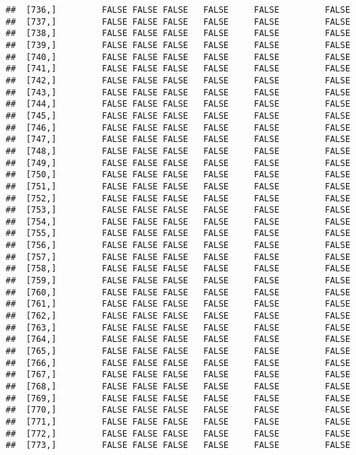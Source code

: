 \documentclass[
]{article}
\begin{document}
\begin{verbatim}
##  [736,]         FALSE FALSE FALSE   FALSE     FALSE         FALSE
##  [737,]         FALSE FALSE FALSE   FALSE     FALSE         FALSE
##  [738,]         FALSE FALSE FALSE   FALSE     FALSE         FALSE
##  [739,]         FALSE FALSE FALSE   FALSE     FALSE         FALSE
##  [740,]         FALSE FALSE FALSE   FALSE     FALSE         FALSE
##  [741,]         FALSE FALSE FALSE   FALSE     FALSE         FALSE
##  [742,]         FALSE FALSE FALSE   FALSE     FALSE         FALSE
##  [743,]         FALSE FALSE FALSE   FALSE     FALSE         FALSE
##  [744,]         FALSE FALSE FALSE   FALSE     FALSE         FALSE
##  [745,]         FALSE FALSE FALSE   FALSE     FALSE         FALSE
##  [746,]         FALSE FALSE FALSE   FALSE     FALSE         FALSE
##  [747,]         FALSE FALSE FALSE   FALSE     FALSE         FALSE
##  [748,]         FALSE FALSE FALSE   FALSE     FALSE         FALSE
##  [749,]         FALSE FALSE FALSE   FALSE     FALSE         FALSE
##  [750,]         FALSE FALSE FALSE   FALSE     FALSE         FALSE
##  [751,]         FALSE FALSE FALSE   FALSE     FALSE         FALSE
##  [752,]         FALSE FALSE FALSE   FALSE     FALSE         FALSE
##  [753,]         FALSE FALSE FALSE   FALSE     FALSE         FALSE
##  [754,]         FALSE FALSE FALSE   FALSE     FALSE         FALSE
##  [755,]         FALSE FALSE FALSE   FALSE     FALSE         FALSE
##  [756,]         FALSE FALSE FALSE   FALSE     FALSE         FALSE
##  [757,]         FALSE FALSE FALSE   FALSE     FALSE         FALSE
##  [758,]         FALSE FALSE FALSE   FALSE     FALSE         FALSE
##  [759,]         FALSE FALSE FALSE   FALSE     FALSE         FALSE
##  [760,]         FALSE FALSE FALSE   FALSE     FALSE         FALSE
##  [761,]         FALSE FALSE FALSE   FALSE     FALSE         FALSE
##  [762,]         FALSE FALSE FALSE   FALSE     FALSE         FALSE
##  [763,]         FALSE FALSE FALSE   FALSE     FALSE         FALSE
##  [764,]         FALSE FALSE FALSE   FALSE     FALSE         FALSE
##  [765,]         FALSE FALSE FALSE   FALSE     FALSE         FALSE
##  [766,]         FALSE FALSE FALSE   FALSE     FALSE         FALSE
##  [767,]         FALSE FALSE FALSE   FALSE     FALSE         FALSE
##  [768,]         FALSE FALSE FALSE   FALSE     FALSE         FALSE
##  [769,]         FALSE FALSE FALSE   FALSE     FALSE         FALSE
##  [770,]         FALSE FALSE FALSE   FALSE     FALSE         FALSE
##  [771,]         FALSE FALSE FALSE   FALSE     FALSE         FALSE
##  [772,]         FALSE FALSE FALSE   FALSE     FALSE         FALSE
##  [773,]         FALSE FALSE FALSE   FALSE     FALSE         FALSE

\end{verbatim}
\end{document}
